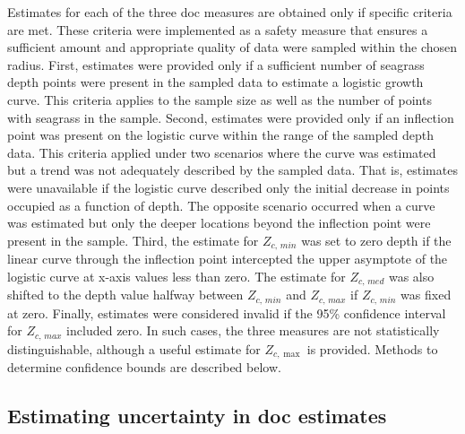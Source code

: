 \documentclass[letterpaper,12pt,oneside]{article}\usepackage[]{graphicx}\usepackage[]{color}
\begin{document}
Estimates for each of the three \ac{doc} measures are obtained only if specific criteria are met.  These criteria were implemented as a safety measure that ensures a sufficient amount and appropriate quality of data were sampled within the chosen radius.  First, estimates were provided only if a sufficient number of seagrass depth points were present in the sampled data to estimate a logistic growth curve.  This criteria applies to the sample size as well as the number of points with seagrass in the sample.  Second, estimates were provided only if an inflection point was present on the logistic curve within the range of the sampled depth data.  This criteria applied under two scenarios where the curve was estimated but a trend was not adequately described by the sampled data.  That is, estimates were unavailable if the logistic curve described only the initial decrease in points occupied as a function of depth.  The opposite scenario occurred when a curve was estimated but only the deeper locations beyond the inflection point were present in the sample.  Third, the estimate for $Z_{c,\,min}$ was set to zero depth if the linear curve through the inflection point intercepted the upper asymptote of the logistic curve at x-axis values less than zero.  The estimate for $Z_{c,\,med}$ was also shifted to the depth value halfway between $Z_{c,\,min}$ and $Z_{c,\,max}$ if $Z_{c,\,min}$ was fixed at zero.  Finally, estimates were considered invalid if the 95\% confidence interval for $Z_{c,\,max}$ included zero.  In such cases, the three measures are not statistically distinguishable, although a useful estimate for $Z_{c,\max}$ is provided.  Methods to determine confidence bounds are described below.  

\subsection{Estimating uncertainty in \acl{doc} estimates}
\end{document}
